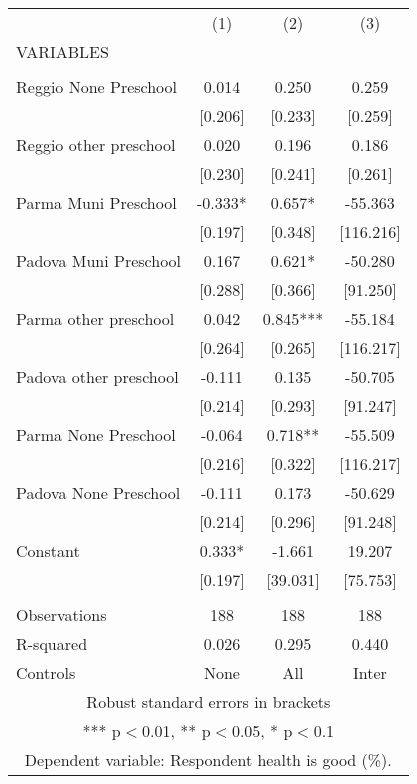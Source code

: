 \begin{tabular}{lccc} \hline
 & (1) & (2) & (3) \\
VARIABLES &  &  &  \\ \hline
 &  &  &  \\
Reggio None Preschool & 0.014 & 0.250 & 0.259 \\
 & [0.206] & [0.233] & [0.259] \\
Reggio other preschool & 0.020 & 0.196 & 0.186 \\
 & [0.230] & [0.241] & [0.261] \\
Parma Muni Preschool & -0.333* & 0.657* & -55.363 \\
 & [0.197] & [0.348] & [116.216] \\
Padova Muni Preschool & 0.167 & 0.621* & -50.280 \\
 & [0.288] & [0.366] & [91.250] \\
Parma other preschool & 0.042 & 0.845*** & -55.184 \\
 & [0.264] & [0.265] & [116.217] \\
Padova other preschool & -0.111 & 0.135 & -50.705 \\
 & [0.214] & [0.293] & [91.247] \\
Parma None Preschool & -0.064 & 0.718** & -55.509 \\
 & [0.216] & [0.322] & [116.217] \\
Padova None Preschool & -0.111 & 0.173 & -50.629 \\
 & [0.214] & [0.296] & [91.248] \\
Constant & 0.333* & -1.661 & 19.207 \\
 & [0.197] & [39.031] & [75.753] \\
 &  &  &  \\
Observations & 188 & 188 & 188 \\
R-squared & 0.026 & 0.295 & 0.440 \\
 Controls & None & All & Inter \\ \hline
\multicolumn{4}{c}{ Robust standard errors in brackets} \\
\multicolumn{4}{c}{ *** p$<$0.01, ** p$<$0.05, * p$<$0.1} \\
\multicolumn{4}{c}{ Dependent variable: Respondent health is good (\%).} \\
\end{tabular}
